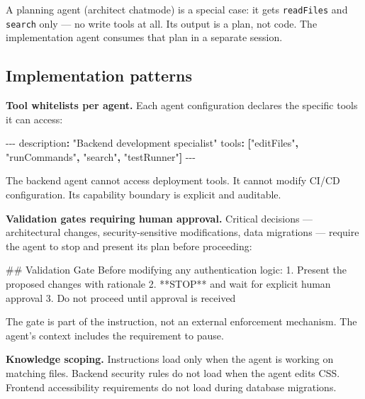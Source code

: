 \documentclass[
  a4paper,
  DIV=11,
  numbers=noendperiod]{scrreprt}
\newenvironment{Shaded}{\begin{snugshade}}{\end{snugshade}}
\newcommand{\AttributeTok}[1]{\textcolor[rgb]{0.40,0.45,0.13}{#1}}
\newcommand{\FunctionTok}[1]{\textcolor[rgb]{0.28,0.35,0.67}{#1}}
\newcommand{\KeywordTok}[1]{\textcolor[rgb]{0.00,0.23,0.31}{\textbf{#1}}}
\newcommand{\NormalTok}[1]{\textcolor[rgb]{0.00,0.23,0.31}{#1}}
\newcommand{\PreprocessorTok}[1]{\textcolor[rgb]{0.68,0.00,0.00}{#1}}
\newcommand{\SpecialStringTok}[1]{\textcolor[rgb]{0.13,0.47,0.30}{#1}}
\newcommand{\StringTok}[1]{\textcolor[rgb]{0.13,0.47,0.30}{#1}}
\begin{document}
A planning agent (architect chatmode) is a special case: it gets
\texttt{readFiles} and \texttt{search} only --- no write tools at all.
Its output is a plan, not code. The implementation agent consumes that
plan in a separate session.

\subsection{Implementation patterns}\label{implementation-patterns-3}

\textbf{Tool whitelists per agent.} Each agent configuration declares
the specific tools it can access:

\begin{Shaded}
\begin{Highlighting}[]
\PreprocessorTok{{-}{-}{-}}
\FunctionTok{description}\KeywordTok{:}\AttributeTok{ }\StringTok{"Backend development specialist"}
\FunctionTok{tools}\KeywordTok{:}\AttributeTok{ }\KeywordTok{[}\StringTok{"editFiles"}\KeywordTok{,}\AttributeTok{ }\StringTok{"runCommands"}\KeywordTok{,}\AttributeTok{ }\StringTok{"search"}\KeywordTok{,}\AttributeTok{ }\StringTok{"testRunner"}\KeywordTok{]}
\PreprocessorTok{{-}{-}{-}}
\end{Highlighting}
\end{Shaded}

The backend agent cannot access deployment tools. It cannot modify CI/CD
configuration. Its capability boundary is explicit and auditable.

\textbf{Validation gates requiring human approval.} Critical decisions
--- architectural changes, security-sensitive modifications, data
migrations --- require the agent to stop and present its plan before
proceeding:

\begin{Shaded}
\begin{Highlighting}[]
\FunctionTok{\#\# Validation Gate}
\NormalTok{Before modifying any authentication logic:}
\SpecialStringTok{1. }\NormalTok{Present the proposed changes with rationale}
\SpecialStringTok{2. }\NormalTok{**STOP** and wait for explicit human approval}
\SpecialStringTok{3. }\NormalTok{Do not proceed until approval is received}
\end{Highlighting}
\end{Shaded}

The gate is part of the instruction, not an external enforcement
mechanism. The agent's context includes the requirement to pause.

\textbf{Knowledge scoping.} Instructions load only when the agent is
working on matching files. Backend security rules do not load when the
agent edits CSS. Frontend accessibility requirements do not load during
database migrations.
\end{document}
